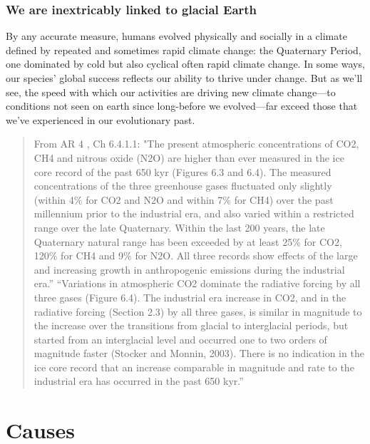 \subsubsection{We are inextricably linked to glacial Earth}
By any accurate measure, humans evolved physically and socially in a climate defined by repeated and sometimes rapid climate change: the Quaternary Period, one dominated by cold but also cyclical often rapid climate change. In some ways, our species' global success reflects our ability to thrive under change.
But as we'll see, the speed with which our activities are driving new climate change---to conditions not seen on earth since long-before we evolved---far exceed those that we've experienced in our evolutionary past. 
\begin{quotation}
	From AR 4 , Ch 6.4.1.1: "The present atmospheric concentrations of CO2, CH4 and nitrous oxide (N2O) are higher than ever measured in the ice core record of the past 650 kyr (Figures 6.3 and 6.4). The measured concentrations of the three greenhouse gases fluctuated only slightly (within 4\% for CO2 and N2O and within 7\% for CH4) over the past millennium prior to the industrial era, and also varied within a restricted range over the late Quaternary. Within the last 200 years, the late Quaternary natural range has been exceeded by at least 25\% for CO2, 120\% for CH4 and 9\% for N2O. All three records show effects of the large and increasing growth in anthropogenic emissions during the industrial era.''
	``Variations in atmospheric CO2 dominate the radiative forcing by all three gases (Figure 6.4). The industrial era increase in CO2, and in the radiative forcing (Section 2.3) by all three gases, is similar in magnitude to the increase over the transitions from glacial to interglacial periods, but started from an interglacial level and occurred one to two orders of magnitude faster (Stocker and Monnin, 2003). There is no indication in the ice core record that an increase comparable in magnitude and rate to the industrial era has occurred in the past 650 kyr.''
\end{quotation}

\section{Causes}\label{Causes}
